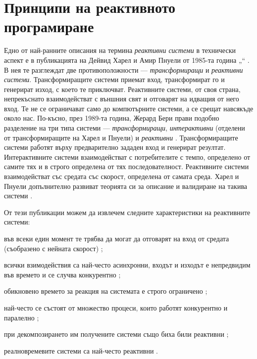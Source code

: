 \chapter{Принципи на реактивното програмиране}
\label{ch:reactive-programming-principles}

Едно от най-ранните описания на термина \emph{реактивни системи} в технически аспект е в публикацията на Дейвид Харел и Амир Пнуели от 1985-та година „“ \cite{harel1985OnReactiveSystems}. В нея те разглеждат две противоположности — \emph{трансформиращи} и \emph{реактивни системи}. Трансформиращите системи приемат вход, трансформират го и генерират изход, с което те приключват. Реактивните системи, от своя страна, непрекъснато взаимодействат с външния свят и отговарят на идващия от него вход. Те не се ограничават само до компютърните системи, а се срещат навсякъде около нас. По-късно, през 1989-та година, Жерард Бери прави подобно разделение на три типа системи — \emph{трансформиращи}, \emph{интерактивни} (отделени от трансформиращите на Харел и Пнуели) и \emph{реактивни} \cite{berry1989RealTimeProgramming}. Трансформиращите системи работят върху предварително зададен вход и генерират резултат. Интерактивните системи взаимодействат с потребителите с темпо, определено от самите тях и в строго определена от тях последователност. Реактивните системи взаимодействат със средата със скорост, определена от самата среда. Харел и Пнуели допълнително развиват теорията си за описание и валидиране на такива системи \cite{harel1998ModelingReactiveSystems, manna1995ReactiveSystemsValidation}.

От тези публикации можем да извлечем следните характеристики на реактивните системи:

\begin{itemize*}
  \item във всеки един момент те трябва да могат да отговарят на вход от средата (съобразено с нейната скорост) \cite{harel1985OnReactiveSystems, berry1989RealTimeProgramming};
  \item всички взимодействия са най-често асинхронни, входът и изходът е непредвидим във времето и се случва конкурентно \cite{harel1998ModelingReactiveSystems};
  \item обикновено времето за реакция на системата е строго ограничено \cite{harel1998ModelingReactiveSystems};
  \item най-често се състоят от множество процеси, които работят конкурентно и паралелно \cite{manna1995ReactiveSystemsValidation, harel1998ModelingReactiveSystems};
  \item при декомпозирането им получените системи също биха били реактивни \cite{harel1985OnReactiveSystems};
  \item реалновремевите системи са най-често реактивни \cite{berry1989RealTimeProgramming, harel1985OnReactiveSystems}.
\end{itemize*}

